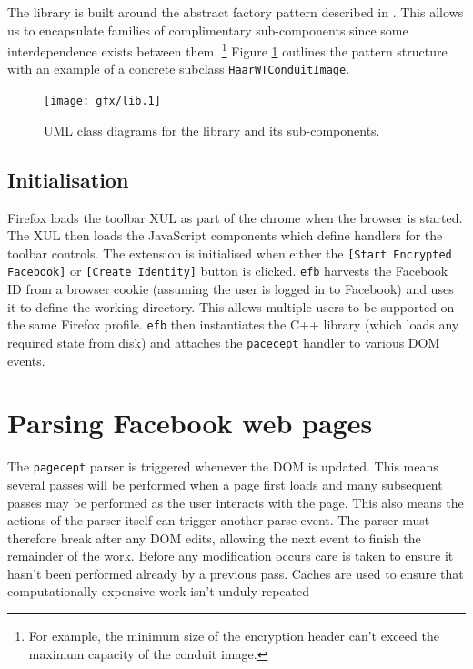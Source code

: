     The library is built around the abstract factory pattern described in \cite{dpatterns}. This allows us to encapsulate families of complimentary sub-components since some interdependence exists between them. \footnote{For example, the minimum size of the encryption header can't exceed the maximum capacity of the conduit image.} Figure \ref{uml:lib-classes} outlines the pattern structure with an example of a concrete subclass {\tt HaarWTConduitImage}.
    
    \begin{figure}[tb]
        \begin{center}
                \texttt{[image: gfx/lib.1]}
            \caption{UML class diagrams for the library and its sub-components.}
            \label{uml:lib-classes}
        \end{center}
    \end{figure}
    
    
\FloatBarrier    
\subsection{Initialisation}

Firefox loads the toolbar XUL as part of the chrome when the browser is started. The XUL then loads the JavaScript components which define handlers for the toolbar controls. The extension is initialised when either the {\tt [Start Encrypted Facebook]} or {\tt [Create Identity]} button is clicked. {\tt efb} harvests the Facebook ID from a browser cookie (assuming the user is logged in to Facebook) and uses it to define the working directory. This allows multiple users to be supported on the same Firefox profile. {\tt efb} then instantiates the C++ library (which loads any required state from disk) and attaches the {\tt pacecept} handler to various DOM events.


\FloatBarrier
\section{Parsing Facebook web pages}
\label{sec:parsing}

The {\tt pagecept} parser is triggered whenever the DOM is updated. This means several passes will be performed when a page first loads and many subsequent passes may be performed as the user interacts with the page. This also means the actions of the parser itself can trigger another parse event. The parser must therefore break after any DOM edits, allowing the next event to finish the remainder of the work. Before any modification occurs care is taken to ensure it hasn't been performed already by a previous pass. Caches are used to ensure that computationally expensive work isn't unduly repeated

